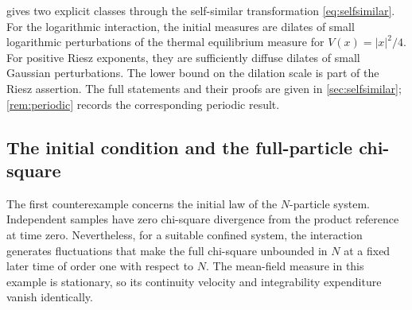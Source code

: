 \documentclass[11pt,reqno]{amsart}
\numberwithin{equation}{section}
\theoremstyle{plain}
\theoremstyle{remark}
\begin{document}
\begin{remark}\label{rem:intro-unconfined}
 gives two explicit classes through the self-similar transformation \eqref{eq:selfsimilar}. For the logarithmic interaction, the initial measures are dilates of small logarithmic perturbations of the thermal equilibrium measure for $V(x)=|x|^2/4$. For positive Riesz exponents, they are sufficiently diffuse dilates of small Gaussian perturbations. The lower bound on the dilation scale is part of the Riesz assertion. The full statements and their proofs are given in \cref{sec:selfsimilar}; \cref{rem:periodic} records the corresponding periodic result.



\end{remark}


\subsection{The initial condition and the full-particle chi-square}\label{sec:intro-iid-counterexample}

The first counterexample concerns the initial law of the $N$-particle system. Independent samples have zero chi-square divergence from the product reference at time zero. Nevertheless, for a suitable confined system, the interaction generates fluctuations that make the full chi-square unbounded in $N$ at a fixed later time of order one with respect to $N$. The mean-field measure in this example is stationary, so its continuity velocity and integrability expenditure vanish identically.
\end{document}
